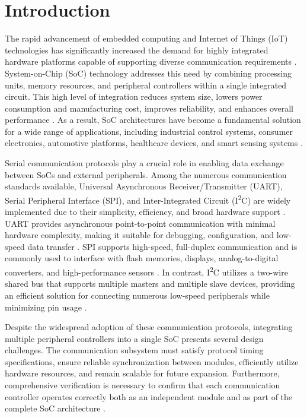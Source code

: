 \documentclass[runningheads]{llncs}
\begin{document}
\section{Introduction}

The rapid advancement of embedded computing and Internet of Things (IoT) technologies has significantly increased the demand for highly integrated hardware platforms capable of supporting diverse communication requirements \cite{wolf2012,furber2000,patterson2021}. System-on-Chip (SoC) technology addresses this need by combining processing units, memory resources, and peripheral controllers within a single integrated circuit. This high level of integration reduces system size, lowers power consumption and manufacturing cost, improves reliability, and enhances overall performance \cite{wolf2012}. As a result, SoC architectures have become a fundamental solution for a wide range of applications, including industrial control systems, consumer electronics, automotive platforms, healthcare devices, and smart sensing systems \cite{furber2000}.

Serial communication protocols play a crucial role in enabling data exchange between SoCs and external peripherals. Among the numerous communication standards available, Universal Asynchronous Receiver/Transmitter (UART), Serial Peripheral Interface (SPI), and Inter-Integrated Circuit (I\textsuperscript{2}C) are widely implemented due to their simplicity, efficiency, and broad hardware support \cite{mazidi2018}. UART provides asynchronous point-to-point communication with minimal hardware complexity, making it suitable for debugging, configuration, and low-speed data transfer \cite{serialportcomplete}. SPI supports high-speed, full-duplex communication and is commonly used to interface with flash memories, displays, analog-to-digital converters, and high-performance sensors \cite{spiblockguide}. In contrast, I\textsuperscript{2}C utilizes a two-wire shared bus that supports multiple masters and multiple slave devices, providing an efficient solution for connecting numerous low-speed peripherals while minimizing pin usage \cite{i2cspec}.

Despite the widespread adoption of these communication protocols, integrating multiple peripheral controllers into a single SoC presents several design challenges. The communication subsystem must satisfy protocol timing specifications, ensure reliable synchronization between modules, efficiently utilize hardware resources, and remain scalable for future expansion. Furthermore, comprehensive verification is necessary to confirm that each communication controller operates correctly both as an independent module and as part of the complete SoC architecture \cite{amba3ahb,amba3apb}.
\end{document}
